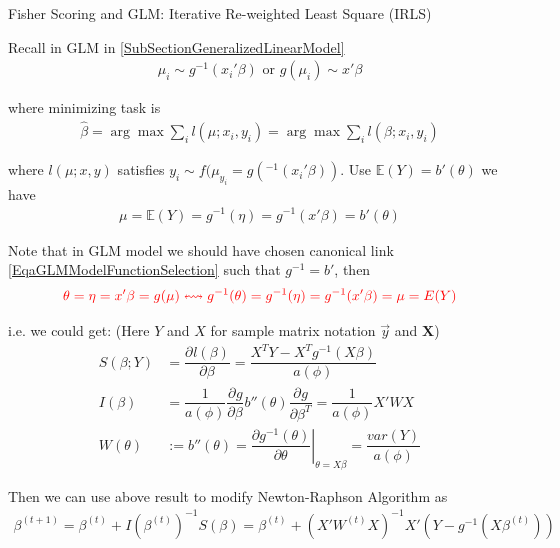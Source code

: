 \begin{point}
    Fisher Scoring and GLM: Iterative Re-weighted Least Square (IRLS)
\end{point}

    Recall in GLM in \autoref{SubSectionGeneralizedLinearModel}
    \begin{align}
        \mu _i\sim g^{-1}(x_i'\beta )\text{ or } g(\mu _i)\sim x'\beta  
    \end{align}
    
     where minimizing task is
    \begin{align}
        \hat{\beta }=\arg\max \sum_{i}l(\mu ;x_i,y_i)=\arg\max \sum_i l(\beta ;x_i,y_i)
    \end{align}
    
    where $ l(\mu ;x,y) $ satisfies $ y_i\sim f(\mu _{y_i}=g(^{-1}(x_i'\beta) ) $. Use $ \mathbb{E}(Y)=b'(\theta ) $ we have 
    \begin{align}
        \mu=\mathbb{E}(Y)= g^{-1}(\eta)={g^{-1}(x'\beta ) =b'(\theta )}
    \end{align}
    
    Note that in GLM model we should have chosen canonical link \autoref{EqaGLMModelFunctionSelection} such that $ g^{-1}=b' $, then 
    \begin{align}
        {\color{red}\theta=\eta=x'\beta =g(\mu )\leftrightsquigarrow g^{-1}(\theta )=g^{-1}(\eta)=g^{-1}(x'\beta )=\mu =E(Y)}
    \end{align}
    
    i.e. we could get: (Here $ Y $ and $ X $ for sample matrix notation $ \vec{y} $ and $ \mathbf{X} $)
\begin{align}
    S(\beta  ;Y)&=\dfrac{\partial^{} l(\beta )}{\partial \beta ^{}}=\dfrac{X^TY-X^Tg^{-1}(X\beta)   }{a(\phi )}\\
    I(\beta)&= \dfrac{1}{a(\phi )}\dfrac{\partial^{} g}{\partial \beta  ^{}}b''(\theta )\dfrac{\partial^{} g}{\partial \beta  ^T}=\dfrac{1}{a(\phi )}X'WX\\
    W(\theta )&:=b''(\theta )=\left.\dfrac{\partial g^{-1}(\theta )}{\partial \theta ^{}}\right|_{\theta=X\beta }=\dfrac{var(Y)}{a(\phi )}
\end{align}

    Then we can use above result to modify Newton-Raphson Algorithm as
    \begin{align}
        \beta ^{(t+1)}=\beta  ^{(t)}+ I(\beta ^{(t)})^{-1}S(\beta  )=\beta  ^{(t)}+(X'W^{(t)}X)^{-1}X'(Y-g^{-1}(X\beta^{(t)} ))
    \end{align}

